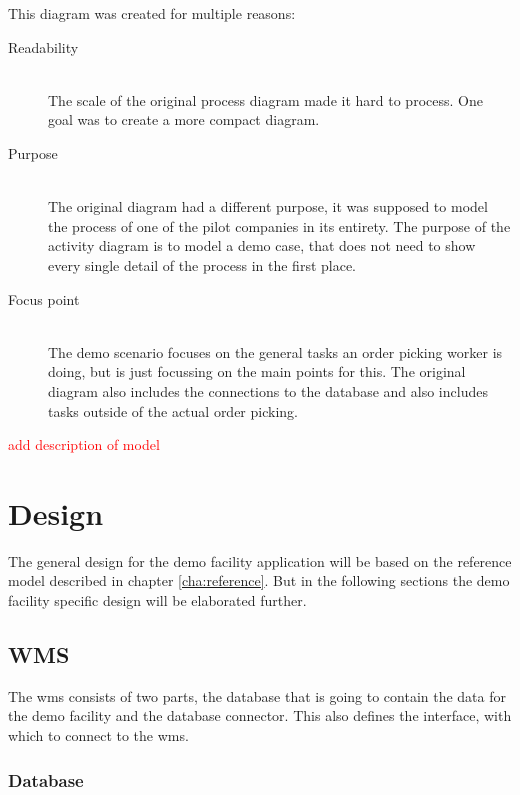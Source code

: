 \cleardoublepage

This diagram was created for multiple reasons:

\begin{description}
	\item[Readability] \hfill \\
	The scale of the original process diagram made it hard to process. One goal was to create a more compact diagram.
	\item[Purpose] \hfill \\
	The original diagram had a different purpose, it was supposed to model the process of one of the pilot companies in its entirety. The purpose of the activity diagram is to model a demo case, that does not need to show every single detail of the process in the first place.
	\item[Focus point] \hfill \\
	The demo scenario focuses on the general tasks an order picking worker is doing, but is just focussing on the main points for this. The original diagram also includes the connections to the database and also includes tasks outside of the actual order picking.
\end{description}

\textcolor{red}{add description of model}

\section{Design}
The general design for the demo facility application will be based on the reference model described in chapter \ref{cha:reference}. But in the following sections the demo facility specific design will be elaborated further.


\subsection{WMS}
The \acrlong{wms} consists of two parts, the database that is going to contain the data for the demo facility and the database connector. This also defines the interface, with which to connect to the \gls{wms}.

\subsubsection{Database}


